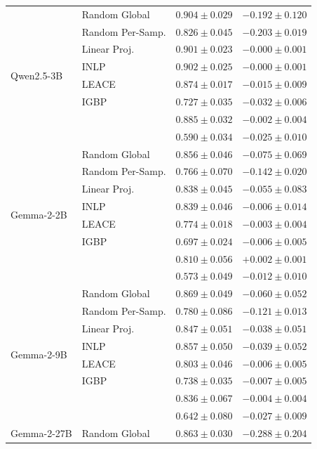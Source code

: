 \begin{longtable}{ll rr}
  \midrule
  \multirow{8}{*}{Qwen2.5-3B} & Random Global & $0.904{\pm}0.029$ & $-0.192{\pm}0.120$ \\
   & Random Per-Samp. & $0.826{\pm}0.045$ & $-0.203{\pm}0.019$ \\
   & Linear Proj. & $0.901{\pm}0.023$ & $-0.000{\pm}0.001$ \\
   & INLP & $0.902{\pm}0.025$ & $-0.000{\pm}0.001$ \\
   & LEACE & $0.874{\pm}0.017$ & $-0.015{\pm}0.009$ \\
   & IGBP & $0.727{\pm}0.035$ & $-0.032{\pm}0.006$ \\
   & \AmbGCE{} & $0.885{\pm}0.032$ & $-0.002{\pm}0.004$ \\
   & \TanGCE{} & \textbf{$0.590{\pm}0.034$} & $-0.025{\pm}0.010$ \\
  \midrule
  \multirow{8}{*}{Gemma-2-2B} & Random Global & $0.856{\pm}0.046$ & $-0.075{\pm}0.069$ \\
   & Random Per-Samp. & $0.766{\pm}0.070$ & $-0.142{\pm}0.020$ \\
   & Linear Proj. & $0.838{\pm}0.045$ & $-0.055{\pm}0.083$ \\
   & INLP & $0.839{\pm}0.046$ & $-0.006{\pm}0.014$ \\
   & LEACE & $0.774{\pm}0.018$ & $-0.003{\pm}0.004$ \\
   & IGBP & $0.697{\pm}0.024$ & $-0.006{\pm}0.005$ \\
   & \AmbGCE{} & $0.810{\pm}0.056$ & $+0.002{\pm}0.001$ \\
   & \TanGCE{} & \textbf{$0.573{\pm}0.049$} & $-0.012{\pm}0.010$ \\
  \midrule
  \multirow{8}{*}{Gemma-2-9B} & Random Global & $0.869{\pm}0.049$ & $-0.060{\pm}0.052$ \\
   & Random Per-Samp. & $0.780{\pm}0.086$ & $-0.121{\pm}0.013$ \\
   & Linear Proj. & $0.847{\pm}0.051$ & $-0.038{\pm}0.051$ \\
   & INLP & $0.857{\pm}0.050$ & $-0.039{\pm}0.052$ \\
   & LEACE & $0.803{\pm}0.046$ & $-0.006{\pm}0.005$ \\
   & IGBP & $0.738{\pm}0.035$ & $-0.007{\pm}0.005$ \\
   & \AmbGCE{} & $0.836{\pm}0.067$ & $-0.004{\pm}0.004$ \\
   & \TanGCE{} & \textbf{$0.642{\pm}0.080$} & $-0.027{\pm}0.009$ \\
  \midrule
  \multirow{8}{*}{Gemma-2-27B} & Random Global & $0.863{\pm}0.030$ & $-0.288{\pm}0.204$ \\

\end{longtable}
